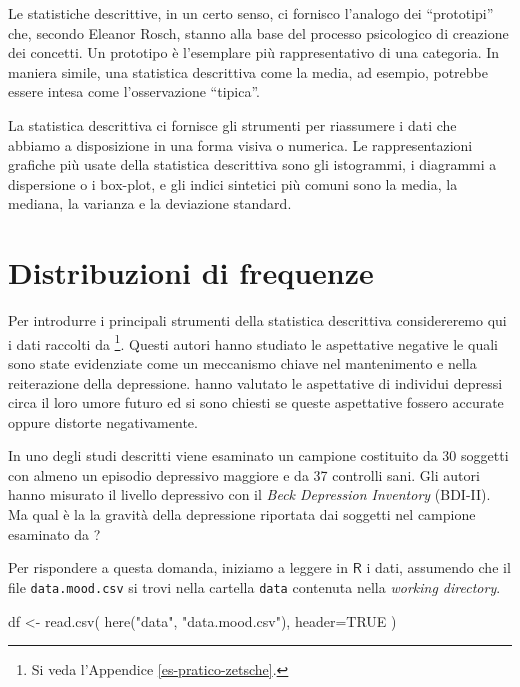 \documentclass[
  10pt,
  italian,
  a4paper,
  extrafontsizes,onecolumn,openright
  ]{memoir}
\newenvironment{Shaded}{\begin{snugshade}}{\end{snugshade}}
\newcommand{\AttributeTok}[1]{\textcolor[rgb]{0.77,0.63,0.00}{#1}}
\newcommand{\ConstantTok}[1]{\textcolor[rgb]{0.00,0.00,0.00}{#1}}
\newcommand{\FunctionTok}[1]{\textcolor[rgb]{0.00,0.00,0.00}{#1}}
\newcommand{\NormalTok}[1]{#1}
\newcommand{\OtherTok}[1]{\textcolor[rgb]{0.56,0.35,0.01}{#1}}
\newcommand{\StringTok}[1]{\textcolor[rgb]{0.31,0.60,0.02}{#1}}
\newcommand{\R}{\textsf{R}} %
\theoremstyle{definition}
\theoremstyle{definition}
\theoremstyle{definition}
\theoremstyle{definition}
\theoremstyle{remark}
\begin{document}
Le statistiche descrittive, in un certo senso, ci fornisco l'analogo dei
``prototipi'' che, secondo Eleanor Rosch, stanno alla base del processo
psicologico di creazione dei concetti. Un prototipo è l'esemplare più
rappresentativo di una categoria. In maniera simile, una statistica
descrittiva come la media, ad esempio, potrebbe essere intesa come
l'osservazione ``tipica''.

La statistica descrittiva ci fornisce gli strumenti per riassumere i
dati che abbiamo a disposizione in una forma visiva o numerica. Le
rappresentazioni grafiche più usate della statistica descrittiva sono
gli istogrammi, i diagrammi a dispersione o i box-plot, e gli indici
sintetici più comuni sono la media, la mediana, la varianza e la
deviazione standard.

\hypertarget{distribuzioni-di-frequenze}{%
\section{Distribuzioni di frequenze}\label{distribuzioni-di-frequenze}}

Per introdurre i principali strumenti della statistica descrittiva considereremo qui i dati raccolti da \textcite{zetschefuture2019}\footnote{Si veda l'Appendice \ref{es-pratico-zetsche}.}. Questi autori hanno studiato le aspettative negative le quali sono state evidenziate come un meccanismo chiave nel mantenimento e nella reiterazione della depressione. \textcite{zetschefuture2019} hanno valutato le aspettative di individui depressi circa il loro umore futuro ed si sono chiesti se queste aspettative fossero accurate oppure distorte negativamente.

In uno degli studi descritti viene esaminato un campione costituito da 30 soggetti con almeno un episodio depressivo maggiore e da 37 controlli sani. Gli autori hanno misurato il livello depressivo con il \emph{Beck Depression Inventory} (BDI-II). Ma qual è la la gravità della depressione riportata dai soggetti nel campione esaminato da \textcite{zetschefuture2019}?

Per rispondere a questa domanda, iniziamo a leggere in \(\R\) i dati, assumendo che il file \texttt{data.mood.csv} si trovi nella cartella \texttt{data} contenuta nella \emph{working directory}.

\begin{Shaded}
\begin{Highlighting}[]
\NormalTok{df }\OtherTok{\textless{}{-}} \FunctionTok{read.csv}\NormalTok{(}
  \FunctionTok{here}\NormalTok{(}\StringTok{"data"}\NormalTok{, }\StringTok{"data.mood.csv"}\NormalTok{), }
  \AttributeTok{header=}\ConstantTok{TRUE}
\NormalTok{) }
\end{Highlighting}
\end{Shaded}
\end{document}
